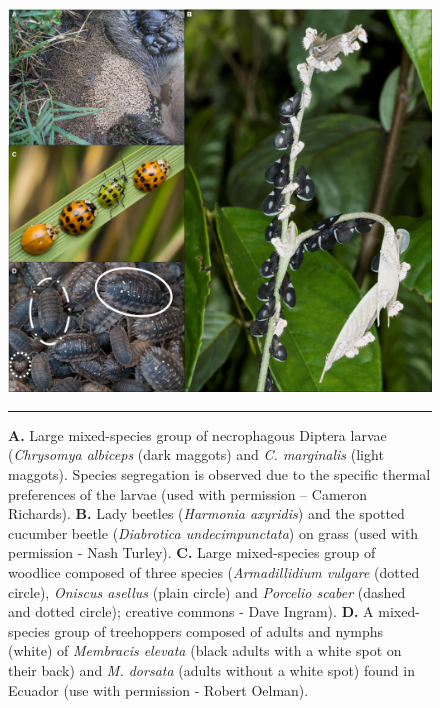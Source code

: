  \begin{figure}[ht]
	\centering
		\includegraphics[width=0.9 \textwidth]{Figures/agreg_th_se.png}
		\rule{35em}{0.5pt}
	\caption[AgregMix]{\textbf{A.} Large mixed-species group of necrophagous Diptera larvae (\textit{Chrysomya albiceps} (dark maggots) and \textit{C. marginalis} (light maggots). Species segregation is observed due to the specific thermal preferences of the larvae (used with permission – Cameron Richards). \textbf{B.} Lady beetles (\textit{Harmonia axyridis}) and the spotted cucumber beetle (\textit{Diabrotica undecimpunctata}) on grass (used with permission - Nash Turley). \textbf{C.} Large mixed-species group of woodlice composed of three species (\textit{Armadillidium vulgare} (dotted circle), \textit{Oniscus asellus} (plain circle) and \textit{Porcelio scaber} (dashed and dotted circle); creative commons - Dave Ingram). \textbf{D.} A mixed-species group of treehoppers composed of adults and nymphs (white) of \textit{Membracis elevata} (black adults with a white spot on their back) and \textit{M. dorsata} (adults without a white spot) found in Ecuador (use with permission - Robert Oelman).}
	\label{fig:agregmix}

\end{figure}
    
